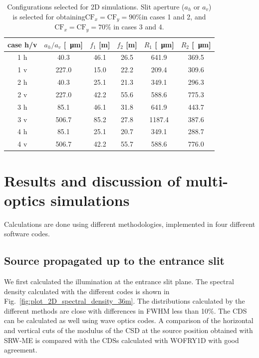 \documentclass{iucr}              %
\begin{document}
\begin{table}[]
    \label{table:2Dusercases}
    \caption{Configurations selected for 2D simulations. Slit aperture ($a_h$ or $a_v$) is selected for obtaining$\text{CF}_{x}=\text{CF}_{y}=90\%$in cases 1 and 2, and $\text{CF}_{x}=\text{CF}_{y}=70\%$ in cases 3 and 4. 
    }
    \begin{tabular}{c|c|c|c|c|c}
         case h/v & $a_h/a_v$ [\SI{}{\micro\meter}] & $f_1$ [m] & $f_2$ [m] & $R_1$ [\SI{}{\micro\meter}]& $R_2$ [\SI{}{\micro\meter}] \\
         \hline
1 h &      40.3 & 46.1 &     26.5 &     641.9 &     369.5 
\\
1 v &      227.0 & 15.0 &     22.2 &     209.4 &     309.6 
\\
\hline
2 h &      40.3 & 25.1 &     21.3 &     349.1 &     296.3  
\\
2 v &      227.0 & 42.2 &     55.6 &     588.6 &     775.3 
\\
\hline \hline
3 h &      85.1 & 46.1 &     31.8 &     641.9 &     443.7 
\\
3 v &      506.7 & 85.2 &     27.8 &     1187.4 &     387.6  
\\
\hline
4 h &      85.1 & 25.1 &     20.7 &     349.1 &     288.7 
\\
4 v &      506.7 & 42.2 &     55.7 &     588.6 &     776.0 

    \end{tabular}
\end{table}


\section{Results and discussion of multi-optics simulations}
\label{sec:complete-beamline}

Calculations are done using different methodologies, implemented in four different software codes. 

\subsection{Source propagated up to the entrance slit}
\label{sec:results36m}

We first calculated the illumination at the entrance slit plane.
The spectral density calculated with the different codes is shown in Fig.~\ref{fig:plot_2D_spectral_density_36m}. The distributions calculated by the different methods are close with differences in FWHM less than 10\%.   
The CDS can be calculated as well using wave optics codes. A comparison of the horizontal and vertical cuts of the modulus of the CSD at the source position obtained with SRW-ME is compared with the CDSs calculated with WOFRY1D with good agreement. 
\end{document}
